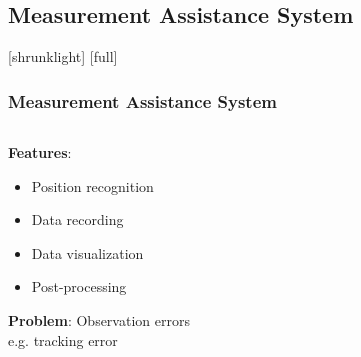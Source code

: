 \documentclass[14pt,compress,aspectratio=169]{beamer} %
\begin{document}
\subsection{Measurement Assistance System} 
[shrunklight]
[full]
\begin{frame}[t]
\frametitle{Measurement Assistance System}
	\begin{columns}[t]	
	\begin{column}{0.48\textwidth}	
	\vspace{\topsep}
	\hspace*{-0.3cm} \textbf{Features}:
	\vspace*{-0.5cm}
		\begin{itemize}
		\item Position recognition
		\item Data recording
		\item Data visualization
		\item Post-processing
		\end{itemize}
	\vspace*{0.3cm}
	\textbf{Problem}: Observation errors\\
	\hspace*{0.3cm} e.g. tracking error 
	\end{column}	
	\begin{column}{0.52\textwidth}
		\begin{overprint} 
		\centering
		\vspace*{-0.5cm}
		\end{overprint}
	\end{column}
	\end{columns}	
	
\end{frame}
\end{document}
